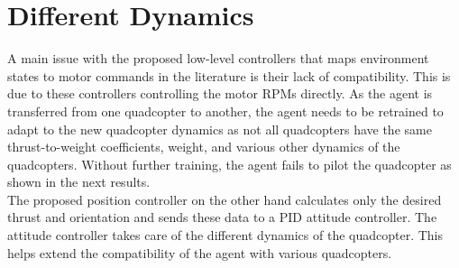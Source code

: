     \section{Different Dynamics}
    A main issue with the proposed low-level controllers that maps environment states to motor commands in the literature is their lack of compatibility. This is due to these controllers controlling the motor RPMs directly. As the agent is transferred from one quadcopter to another, the agent needs to be retrained to adapt to the new quadcopter dynamics as not all quadcopters have the same thrust-to-weight coefficients, weight, and various other dynamics of the quadcopters. Without further training, the agent fails to pilot the quadcopter as shown in the next results.\\

    The proposed position controller on the other hand calculates only the desired thrust and orientation and sends these data to a PID attitude controller. The attitude controller takes care of the different dynamics of the quadcopter. This helps extend the compatibility of the agent with various quadcopters.\\

